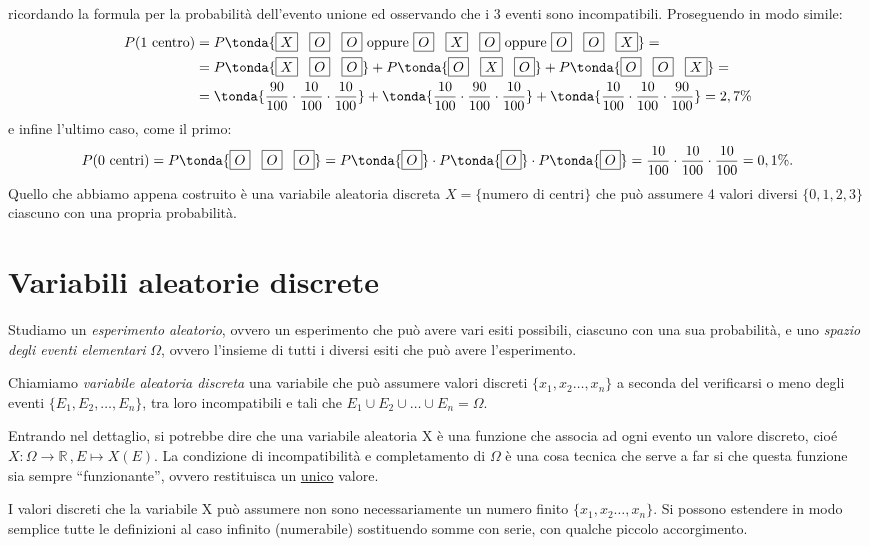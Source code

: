  ricordando la formula per la probabilità dell'evento unione ed osservando che i 3 eventi sono incompatibili. Proseguendo in modo simile:
 \[ \begin{split} P(\text{1 centro})&= P\tonda{\text{\boxed{X} \, \boxed{O} \, \boxed{O}} \text{ oppure } \text{\boxed{O} \, \boxed{X} \, \boxed{O}} \text{ oppure } \text{\boxed{O} \, \boxed{O} \, \boxed{X}}} =\\ &= 
P\tonda{\text{\boxed{X} \, \boxed{O} \, \boxed{O}}} +P\tonda{\text{\boxed{O} \, \boxed{X} \, \boxed{O}}} + P\tonda{ \text{\boxed{O} \, \boxed{O} \, \boxed{X}}} =\\ &=
 \tonda{\dfrac{90}{100} \cdot \dfrac{10}{100}  \cdot \dfrac{10}{100}}+ \tonda{\dfrac{10}{100} \cdot \dfrac{90}{100}  \cdot \dfrac{10}{100}}+ \tonda{\dfrac{10}{100} \cdot \dfrac{10}{100}  \cdot \dfrac{90}{100} } = 2,7 \%  \end{split}\]
 e infine l'ultimo caso, come il primo:
\[ P(\text{0 centri})= P\tonda{\text{\boxed{O} \, \boxed{O} \, \boxed{O}}} = P \tonda{\text{\boxed{O}}} \cdot P \tonda{\text{\boxed{O}}} \cdot P \tonda{\text{\boxed{O}}} = \dfrac{10}{100} \cdot \dfrac{10}{100}  \cdot \dfrac{10}{100}   = 
0,1\%. \]
Quello che abbiamo appena costruito è una variabile aleatoria discreta \(X = \{\text{numero di centri}\}\) che può assumere 4 valori diversi \(\{0,1,2,3\}\) ciascuno con una propria probabilità.

\section{Variabili aleatorie discrete}
\label{sec:01_discrete}

Studiamo un \emph{esperimento aleatorio}, ovvero un esperimento che può avere vari esiti possibili, ciascuno con una sua probabilità, e uno \emph{spazio degli eventi elementari} $\Omega$, ovvero l'insieme di tutti i diversi esiti che può avere l'esperimento.

\begin{definizione} Chiamiamo \emph{variabile aleatoria discreta} una variabile che può assumere valori discreti $\{x_1,x_2\dots,x_n\}$ a seconda del verificarsi o meno degli eventi $\{E_1, E_2,\dots, E_n\}$, tra loro incompatibili e tali che $E_1 \cup E_2 \cup \dots \cup E_n = \Omega$.
\end{definizione}

Entrando nel dettaglio, si potrebbe dire che una variabile aleatoria X è una funzione che associa ad ogni evento un valore discreto, cioé $X:\Omega \longrightarrow \mathbb{R}\,, E \longmapsto X(E)$. La condizione di incompatibilità e completamento di $\Omega$ è una cosa tecnica che serve a far si che questa funzione sia sempre ``funzionante'', ovvero restituisca \underline{} un \underline{unico} valore.
\begin{osservazione} I valori discreti che la variabile X può assumere non sono necessariamente un numero finito $\{x_1,x_2\dots,x_n\}$. Si possono estendere in modo semplice tutte le definizioni al caso infinito (numerabile) sostituendo somme con serie, con qualche piccolo accorgimento.
\end{osservazione}

